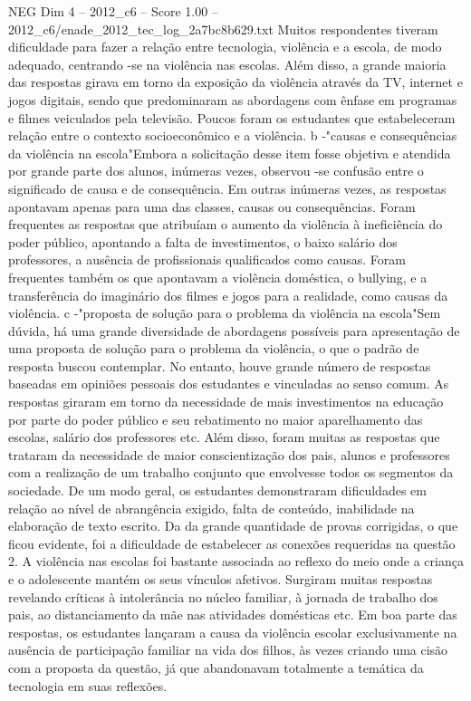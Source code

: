 \begin{textsample}{NEG Dim 4 – 2012\_c6 – Score 1.00 – 2012\_c6/enade\_2012\_tec\_log\_2a7bc8b629.txt}
Muitos respondentes tiveram dificuldade para fazer a relação entre tecnologia, violência e a escola, de modo adequado, centrando -se na violência nas escolas.
Além disso, a grande maioria das respostas girava em torno da exposição da violência através da TV, internet e jogos digitais, sendo que predominaram as abordagens com ênfase em programas e filmes veiculados pela televisão.
Poucos foram os estudantes que estabeleceram relação entre o contexto socioeconômico e a violência. b -"causas e consequências da violência na escola"Embora a solicitação desse item fosse objetiva e atendida por grande parte dos alunos, inúmeras vezes, observou -se confusão entre o significado de causa e de consequência.
Em outras inúmeras vezes, as respostas apontavam apenas para uma das classes, causas ou consequências.
Foram frequentes as respostas que atribuíam o aumento da violência à ineficiência do poder público, apontando a falta de investimentos, o baixo salário dos professores, a ausência de profissionais qualificados como causas.
Foram frequentes também os que apontavam a violência doméstica, o bullying, e a transferência do imaginário dos filmes e jogos para a realidade, como causas da violência. c -"proposta de solução para o problema da violência na escola"Sem dúvida, há uma grande diversidade de abordagens possíveis para apresentação de uma proposta de solução para o problema da violência, o que o padrão de resposta buscou contemplar.
No entanto, houve grande número de respostas baseadas em opiniões pessoais dos estudantes e vinculadas ao senso comum.
As respostas giraram em torno da necessidade de mais investimentos na educação por parte do poder público e seu rebatimento no maior aparelhamento das escolas, salário dos professores etc.
Além disso, foram muitas as respostas que trataram da necessidade de maior conscientização dos pais, alunos e professores com a realização de um trabalho conjunto que envolvesse todos os segmentos da sociedade.
De um modo geral, os estudantes demonstraram dificuldades em relação ao nível de abrangência exigido, falta de conteúdo, inabilidade na elaboração de texto escrito.
Da da grande quantidade de provas corrigidas, o que ficou evidente, foi a dificuldade de estabelecer as conexões requeridas na questão 2.
A violência nas escolas foi bastante associada ao reflexo do meio onde a criança e o adolescente mantém os seus vínculos afetivos.
Surgiram muitas respostas revelando críticas à intolerância no núcleo familiar, à jornada de trabalho dos pais, ao distanciamento da mãe nas atividades domésticas etc.
Em boa parte das respostas, os estudantes lançaram a causa da violência escolar exclusivamente na ausência de participação familiar na vida dos filhos, às vezes criando uma cisão com a proposta da questão, já que abandonavam totalmente a temática da tecnologia em suas reflexões.

\end{textsample}

